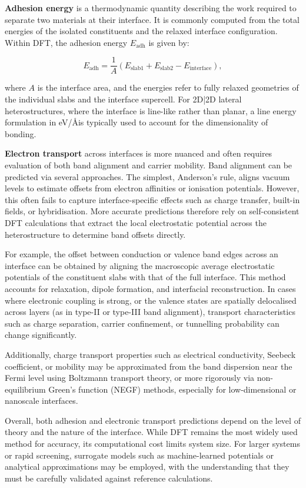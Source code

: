 \textbf{Adhesion energy} is a thermodynamic quantity describing the work required to separate two materials at their interface. It is commonly computed from the total energies of the isolated constituents and the relaxed interface configuration. Within DFT, the adhesion energy $E_\mathrm{adh}$ is given by:

\[ E_\mathrm{adh} = \frac{1}{A} \left( E_\mathrm{slab1} + E_\mathrm{slab2} - E_\mathrm{interface} \right), \]

where $A$ is the interface area, and the energies refer to fully relaxed geometries of the individual slabs and the interface supercell. For 2D|2D lateral heterostructures, where the interface is line-like rather than planar, a line energy formulation in eV/\AA is typically used to account for the dimensionality of bonding.

\textbf{Electron transport} across interfaces is more nuanced and often requires evaluation of both band alignment and carrier mobility. Band alignment can be predicted via several approaches. The simplest, Anderson's rule, aligns vacuum levels to estimate offsets from electron affinities or ionisation potentials. However, this often fails to capture interface-specific effects such as charge transfer, built-in fields, or hybridisation. More accurate predictions therefore rely on self-consistent DFT calculations that extract the local electrostatic potential across the heterostructure to determine band offsets directly.

For example, the offset between conduction or valence band edges across an interface can be obtained by aligning the macroscopic average electrostatic potentials of the constituent slabs with that of the full interface. This method accounts for relaxation, dipole formation, and interfacial reconstruction. In cases where electronic coupling is strong, or the valence states are spatially delocalised across layers (as in type-II or type-III band alignment), transport characteristics such as charge separation, carrier confinement, or tunnelling probability can change significantly.

Additionally, charge transport properties such as electrical conductivity, Seebeck coefficient, or mobility may be approximated from the band dispersion near the Fermi level using Boltzmann transport theory, or more rigorously via non-equilibrium Green's function (NEGF) methods, especially for low-dimensional or nanoscale interfaces.

Overall, both adhesion and electronic transport predictions depend on the level of theory and the nature of the interface. While DFT remains the most widely used method for accuracy, its computational cost limits system size. For larger systems or rapid screening, surrogate models such as machine-learned potentials or analytical approximations may be employed, with the understanding that they must be carefully validated against reference calculations.